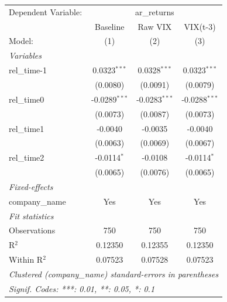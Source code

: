 
\begingroup
\centering
\begin{tabular}{lccc}
   \tabularnewline \midrule \midrule
   Dependent Variable: & \multicolumn{3}{c}{ar\_returns}\\
                  & Baseline        & Raw VIX         & VIX(t-3) \\   
   Model:         & (1)             & (2)             & (3)\\  
   \midrule
   \emph{Variables}\\
   rel\_time-1    & 0.0323$^{***}$  & 0.0328$^{***}$  & 0.0323$^{***}$\\   
                  & (0.0080)        & (0.0091)        & (0.0079)\\   
   rel\_time0     & -0.0289$^{***}$ & -0.0283$^{***}$ & -0.0288$^{***}$\\   
                  & (0.0073)        & (0.0087)        & (0.0073)\\   
   rel\_time1     & -0.0040         & -0.0035         & -0.0040\\   
                  & (0.0063)        & (0.0069)        & (0.0067)\\   
   rel\_time2     & -0.0114$^{*}$   & -0.0108         & -0.0114$^{*}$\\   
                  & (0.0065)        & (0.0076)        & (0.0065)\\   
   \midrule
   \emph{Fixed-effects}\\
   company\_name  & Yes             & Yes             & Yes\\  
   \midrule
   \emph{Fit statistics}\\
   Observations   & 750             & 750             & 750\\  
   R$^2$          & 0.12350         & 0.12355         & 0.12350\\  
   Within R$^2$   & 0.07523         & 0.07528         & 0.07523\\  
   \midrule \midrule
   \multicolumn{4}{l}{\emph{Clustered (company\_name) standard-errors in parentheses}}\\
   \multicolumn{4}{l}{\emph{Signif. Codes: ***: 0.01, **: 0.05, *: 0.1}}\\
\end{tabular}
\par\endgroup


